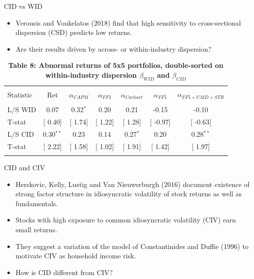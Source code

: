 \documentclass{beamer}
\begin{document}
\normalsize
\begin{frame}{CID vs WID}
\begin{itemize}
    \item {Verousis and Voukelatos (2018) find that high sensitivity to cross-sectional dispersion (CSD) predicts low returns.}
    \item {Are their results driven by across- or within-industry dispersion?}
\end{itemize}
\scriptsize
\begin{table}[!htbp] \centering 
  \caption*{\textbf{Table 8: Abnormal returns of 5x5 portfolios, double-sorted on within-industry dispersion $\beta_{WID}$ and $\beta_{CID}$}} 
  \label{} 
\begin{tabular}{@{\extracolsep{5pt}} lcccccc} 
\\[-1.8ex]\hline 
\hline \\[-1.8ex] 
Statistic & Ret & $\alpha_{CAPM}$ & $\alpha_{FF3}$ & $\alpha_{Carhart}$ & $\alpha_{FF5}$ & $\alpha_{FF5+UMD+STR}$ \\ 
\hline \\[-1.8ex] 
L/S WID & 0.07 & 0.32$^{*}$ & 0.20 & 0.21 & -0.15 & -0.10 \\ 
T-stat & [ 0.40] & [ 1.74] & [ 1.22] & [ 1.28] & [ -0.97] & [ -0.63] \\ 
L/S CID & 0.30$^{**}$ & 0.23 & 0.14 & 0.27$^{*}$ & 0.20 & 0.28$^{**}$ \\ 
T-stat & [ 2.22] & [ 1.58] & [ 1.02] & [ 1.91] & [ 1.42] & [ 1.97] \\ 
\hline \\[-1.8ex] 
\end{tabular} 
\end{table}
\end{frame}


\normalsize
\begin{frame}{CID and CIV}
\begin{itemize}
    \item {Herskovic, Kelly, Lustig and Van Nieuwerburgh (2016) document existence of strong factor structure in idiosyncratic volatility of stock returns as well as fundamentals.}
    \item {Stocks with high exposure to common idiosyncratic volatility (CIV) earn small returns.}
    \item {They suggest a variation of the model of Constantinides and Duffie (1996) to motivate CIV as household income risk.}
    \item {How is CID different from CIV?}
\end{itemize}

\end{frame}
\end{document}
